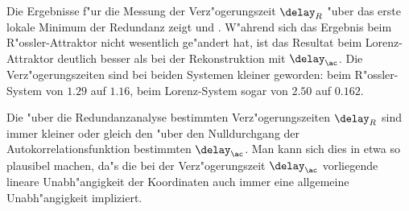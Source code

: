 Die Ergebnisse f"ur die Messung der Verz"ogerungszeit $\delay_R$ "uber das erste lokale
Minimum der Redundanz zeigt  und . W"ahrend sich das Ergebnis beim
R"ossler-Attraktor nicht wesentlich ge"andert hat, ist das Resultat beim Lorenz-Attraktor
deutlich besser als bei der Rekonstruktion mit $\delay_\ac$. Die Verz"ogerungszeiten sind
bei beiden Systemen kleiner geworden: beim R"ossler-System von $1.29$ auf $1.16$, beim
Lorenz-System sogar von $2.50$ auf $0.162$.  

Die "uber die
Redundanzanalyse bestimmten Verz"ogerungszeiten $\delay_R$ sind immer kleiner oder gleich den
"uber den Nulldurchgang der Autokorrelationsfunktion bestimmten $\delay_\ac$. Man kann
sich dies in etwa so plausibel machen, da"s die bei der Verz"ogerungszeit $\delay_\ac$
vorliegende lineare Unabh"angigkeit der Koordinaten auch immer eine allgemeine
Unabh"angigkeit impliziert.


\clearpage










